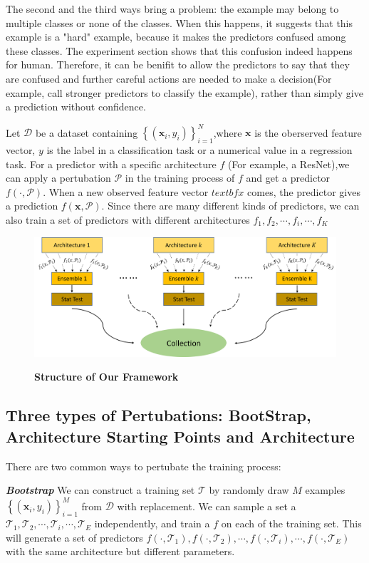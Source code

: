 \documentclass{article}
\begin{document}
The second and the third ways bring a problem: the example may belong to multiple classes or none of the classes. When this happens, it suggests that this example is a "hard" example, because it makes the predictors confused among these classes. The experiment section shows that this confusion indeed happens for human. Therefore, it can be benifit to allow the predictors to say that they are confused and further careful actions are needed to make a decision(For example, call stronger predictors to classify the example), rather than simply give a prediction without confidence. 


Let $\mathcal{D}$ be a dataset containing $\left\{\left( \textbf{x}_i ,y_i\right)\right\}_{i=1}^N $,where $\textbf{x}$ is the oberserved feature vector, $y$ is the label in a classification task or a numerical value in a regression task. For a predictor with a specific architecture $f$ (For example, a ResNet),we can apply a pertubation $\mathcal{P}$ in the training process of $f$ and get a predictor $f \left(\cdot , \mathcal{P}\right)$. When a new observed feature vector $textbf{x}$ comes, the predictor gives a prediction $f \left(\textbf{x} , \mathcal{P}\right)$. Since there are many different kinds of predictors, we can also train a set of predictors with different architectures $f_1,f_2,\cdots,f_i,\cdots,f_K$

\begin{figure}[H]
    \includegraphics[width=\textwidth]{figs/overall_structure.png}
\label{fig:struc}
\caption{\textbf{Structure of Our Framework}}
\end{figure}

\subsection{Three types of Pertubations: BootStrap, Architecture Starting Points and Architecture }
There are two common ways to pertubate the training process:

\textit{\textbf{Bootstrap}} We can construct a training set $\mathcal{T}$ by randomly draw $M$ examples $\left\{\left( \textbf{x}_i ,y_i\right)\right\}_{i=1}^M $ from $\mathcal{D}$ with replacement. We can sample a set a $\mathcal{T}_1,\mathcal{T}_2,\cdots,\mathcal{T}_i,\cdots,\mathcal{T}_E$ independently, and train a $f$ on each of the training set.
This will generate a set of predictors $f \left(\cdot , \mathcal{T}_1\right), f \left(\cdot , \mathcal{T}_2\right),\cdots, f \left(\cdot , \mathcal{T}_i\right),\cdots,f \left(\cdot , \mathcal{T}_E\right) $ with the same architecture but different parameters.
\end{document}

